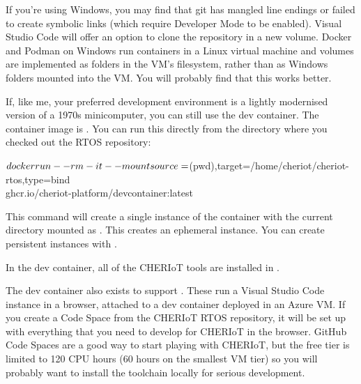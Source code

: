 \begin{caution}
	If you're using Windows, you may find that git has mangled line endings or failed to create symbolic links (which require Developer Mode to be enabled).
	Visual Studio Code will offer an option to clone the repository in a new volume.
	Docker and Podman on Windows run containers in a Linux virtual machine and volumes are implemented as folders in the VM's filesystem, rather than as Windows folders mounted into the VM.
	You will probably find that this works better.
\end{caution}

If, like me, your preferred development environment is a lightly modernised version of a 1970s minicomputer, you can still use the dev container.
The container image is .
You can run this directly from the directory where you checked out the RTOS repository:

\begin{console}
$ docker run --rm -it --mount \\
	source=$(pwd),target=/home/cheriot/cheriot-rtos,type=bind \\
	ghcr.io/cheriot-platform/devcontainer:latest
\end{console}

This command will create a single instance of the container with the current directory mounted as .
This creates an ephemeral instance. 
You can create persistent instances with .

In the dev container, all of the CHERIoT tools are installed in .

\begin{note}
	The dev container also exists to support .
	These run a Visual Studio Code instance in a browser, attached to a dev container deployed in an Azure VM.
	If you create a Code Space from the CHERIoT RTOS repository, it will be set up with everything that you need to develop for CHERIoT in the browser.
	GitHub Code Spaces are a good way to start playing with CHERIoT, but the free tier is limited to 120 CPU hours (60 hours on the smallest VM tier) so you will probably want to install the toolchain locally for serious development.
\end{note}

